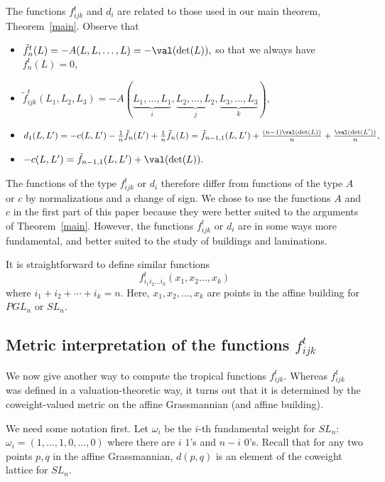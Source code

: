 \begin{rema} \label{normalization} The functions $f_{ijk}^t$ and $d_i$ are related to those used in our main theorem, Theorem~\ref{main}. Observe that

\begin{itemize}
\item $\tilde{f}^t_n(L)= -A(L, L, \dots, L) = -\val(\det(L)),$ so that we always have $f^t_n(L)=0$,
\item $\tilde{f}_{ijk}^t (L_1,L_2,L_3) = -A(\underbrace{L_1,\ldots,L_1}_{i}, \underbrace{L_2,\ldots,L_2}_{j}, \underbrace{L_3,\ldots,L_3}_{k}),$
\item $d_1(L, L') = -c(L, L') - \frac{1}{n} \tilde{f}_n(L') + \frac{1}{n} \tilde{f}_n(L) = \tilde{f}_{n-1,1}(L,L') + \frac{(n-1)\val(\det(L))}{n} + \frac{\val(\det(L'))}{n},$ 
\item $-c(L, L') = \tilde{f}_{n-1,1}(L,L') + \val(\det(L)).$
\end{itemize}

The functions of the type $f_{ijk}^t$ or $d_i$ therefore differ from functions of the type $A$ or $c$ by normalizations and a change of sign. We chose to use the functions $A$ and $c$ in the first part of this paper because they were better suited to the arguments of Theorem~\ref{main}. However, the functions $f_{ijk}^t$ or $d_i$ are in some ways more fundamental, and better suited to the study of buildings and laminations.

\end{rema}

It is straightforward to define similar functions 
\[
f_{i_1i_2\dots i_k}^t(x_1,x_2\dots,x_k) %
\]
where $i_1+i_2+\cdots+i_k=n$. Here, $x_1, x_2, \dots, x_k$ are points in the affine building for $PGL_n$ or $SL_n$.

\subsection{Metric interpretation of the functions \texorpdfstring{$f^t_{ijk}$}{f ijk t}}

We now give another way to compute the tropical functions $f_{ijk}^t$. Whereas $f_{ijk}^t$ was defined in a valuation-theoretic way, it turns out that it is determined by the coweight-valued metric on the affine Grassmannian (and affine building).

We need some notation first. Let $\omega_i$ be the $i$-th fundamental weight for $SL_n$: $\omega_i = (1, \dots, 1, 0, \dots, 0)$ where there are $i$ $1$'s and $n-i$ $0$'s. Recall that for any two points $p, q$ in the affine Grassmannian, $d(p,q)$ is an element of the coweight lattice for $SL_n$.


